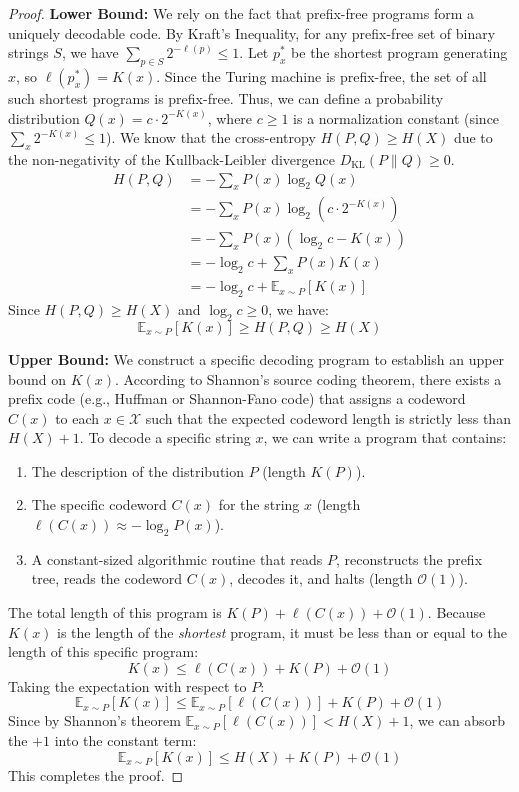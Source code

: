 \begin{proof}
\textbf{Lower Bound:} We rely on the fact that prefix-free programs form a uniquely decodable code. By Kraft's Inequality, for any prefix-free set of binary strings $S$, we have $\sum_{p \in S} 2^{-\ell(p)} \le 1$. 
Let $p^*_x$ be the shortest program generating $x$, so $\ell(p^*_x) = K(x)$. Since the Turing machine is prefix-free, the set of all such shortest programs is prefix-free. Thus, we can define a probability distribution $Q(x) = c \cdot 2^{-K(x)}$, where $c \ge 1$ is a normalization constant (since $\sum_x 2^{-K(x)} \le 1$). We know that the cross-entropy $H(P, Q) \ge H(X)$ due to the non-negativity of the Kullback-Leibler divergence $D_{\text{KL}}(P \parallel Q) \ge 0$.
\begin{align*}
    H(P, Q) &= -\sum_x P(x) \log_2 Q(x) \\
            &= -\sum_x P(x) \log_2 (c \cdot 2^{-K(x)}) \\
            &= -\sum_x P(x) (\log_2 c - K(x)) \\
            &= -\log_2 c + \sum_x P(x) K(x) \\
            &= -\log_2 c + \mathbb{E}_{x \sim P}[K(x)]
\end{align*}
Since $H(P, Q) \ge H(X)$ and $\log_2 c \ge 0$, we have:
\[ \mathbb{E}_{x \sim P}[K(x)] \ge H(P, Q) \ge H(X) \]

\textbf{Upper Bound:} We construct a specific decoding program to establish an upper bound on $K(x)$. According to Shannon's source coding theorem, there exists a prefix code (e.g., Huffman or Shannon-Fano code) that assigns a codeword $C(x)$ to each $x \in \mathcal{X}$ such that the expected codeword length is strictly less than $H(X) + 1$. To decode a specific string $x$, we can write a program that contains:
\begin{enumerate}
    \item The description of the distribution $P$ (length $K(P)$).
    \item The specific codeword $C(x)$ for the string $x$ (length $\ell(C(x)) \approx -\log_2 P(x)$).
    \item A constant-sized algorithmic routine that reads $P$, reconstructs the prefix tree, reads the codeword $C(x)$, decodes it, and halts (length $\mathcal{O}(1)$).
\end{enumerate}
The total length of this program is $K(P) + \ell(C(x)) + \mathcal{O}(1)$. Because $K(x)$ is the length of the \textit{shortest} program, it must be less than or equal to the length of this specific program:
\[ K(x) \le \ell(C(x)) + K(P) + \mathcal{O}(1) \]
Taking the expectation with respect to $P$:
\[ \mathbb{E}_{x \sim P}[K(x)] \le \mathbb{E}_{x \sim P}[\ell(C(x))] + K(P) + \mathcal{O}(1) \]
Since by Shannon's theorem $\mathbb{E}_{x \sim P}[\ell(C(x))] < H(X) + 1$, we can absorb the $+1$ into the constant term:
\[ \mathbb{E}_{x \sim P}[K(x)] \le H(X) + K(P) + \mathcal{O}(1) \]
This completes the proof.
\end{proof}

